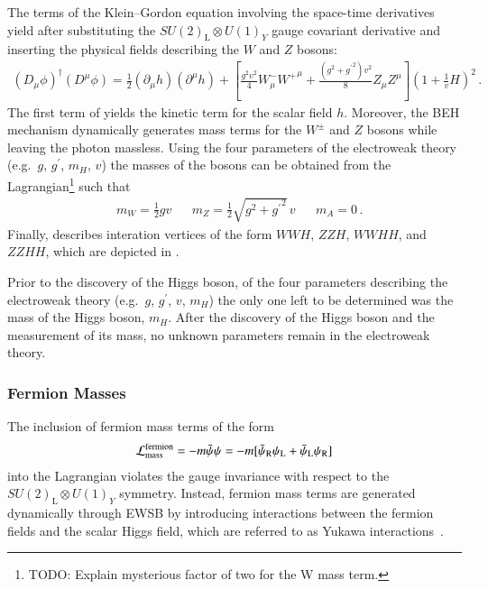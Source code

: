 The terms of the Klein--Gordon equation involving the space-time derivatives
yield after substituting the $SU(2)_{\text{L}} \otimes U(1)_Y$ gauge covariant
derivative and inserting the physical fields describing the $W$ and $Z$ bosons:
\begin{align}
  (D_\mu \phi)^\dagger (D^\mu \phi) =
  \frac{1}{2} (\partial_\mu h) (\partial^\mu h)
  + \left[
  \frac{g^2 v^2}{4} W^{-}_\mu {W^{+}}^\mu
  +
  \frac{(g^2 + {g^\prime}^2) v^2}{8} Z_\mu Z^\mu
  \right] \left( 1 + \frac{1}{v} H \right)^2 \,\text{.}
  \label{eq:higgs_covariant_derivative}
\end{align}
The first term of  yields the kinetic term
for the scalar field $h$. Moreover, the BEH mechanism dynamically generates mass
terms for the $W^\pm$ and $Z$ bosons while leaving the photon massless. Using
the four parameters of the electroweak theory (e.g.\ $g$, $g^\prime$, $m_{H}$,
$v$) the masses of the bosons can be obtained from the Lagrangian\footnote{TODO:
  Explain mysterious factor of two for the W mass term.}  such that
\begin{align*}
  &m_W = \frac{1}{2} g v  &&m_Z = \frac{1}{2} \sqrt{g^2 + {g^\prime}^2} \, v && m_A = 0 \,\text{.}
\end{align*}
Finally,  describes interation vertices of
the form $WWH$, $ZZH$, $WWHH$, and $ZZHH$, which are depicted in
.

Prior to the discovery of the Higgs boson, of the four parameters describing the
electroweak theory (e.g.\ $g$, $g^\prime$, $v$, $m_{H}$) the only one left to be
determined was the mass of the Higgs boson, $m_{H}$.
After the discovery of the Higgs boson and the measurement of its mass, no
unknown parameters remain in the electroweak theory.



\subsubsection{Fermion Masses}

The inclusion of fermion mass terms of the form
\begin{align*}
  \mathcal{L}_{\text{mass}}^{\text{fermion}} = - m \bar{\psi} \psi = - m [ \bar{\psi}_\text{R} \psi_\text{L} + \bar{\psi}_\text{L} \psi_\text{R} ]
\end{align*}
into the Lagrangian violates the gauge invariance with respect to the
$SU(2)_{\text{L}} \otimes U(1)_Y$ symmetry. Instead, fermion mass terms are
generated dynamically through EWSB by introducing interactions between the
fermion fields and the scalar Higgs field, which are referred to as Yukawa
interactions~\cite{Yukawa:1935xg}.

